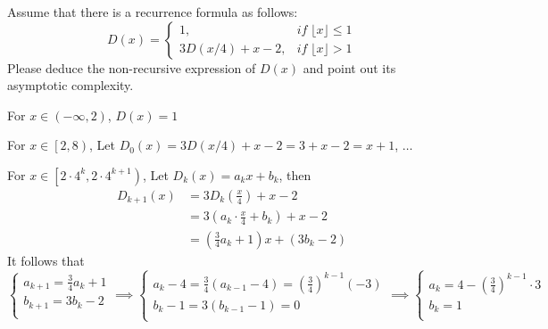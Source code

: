 \begin{exercise}[]{Assume that there is a recurrence formula as follows: 
  \begin{equation*}
    D(x) = \begin{cases}
    1, &if\;\lfloor x \rfloor \leq 1\\
    3D(x/4) + x - 2, &if\;\lfloor x \rfloor  > 1
    \end{cases}
  \end{equation*}
  Please deduce the non-recursive expression of $D(x)$ and point out its asymptotic complexity.    }
  \begin{solution}
  For $x\in \left(-\infty,2\right)$, $D(x)=1$

  For $x\in \left[2,8 \right)$, Let $D_{0}(x)=3D(x/4) + x - 2 = 3 + x -2 = x + 1$, $\ldots$

  For $x\in \left[2\cdot 4^{k}, 2\cdot 4^{k+1}\right)$, Let $D_{k}(x) = a_k x + b_k$, then
  \begin{equation}
    \begin{aligned}
      D_{k+1}(x) &= 3D_k (\frac{x}{4}) + x - 2 \\
      &= 3 \left(a_k \cdot \frac{x}{4} + b_k \right) + x - 2 \\
      &= \left(\frac{3}{4}a_k + 1 \right)x + (3b_k - 2)
    \end{aligned}
  \end{equation}
  It follows that
  \begin{equation}\left\{
    \begin{array}{l}
      a_{k+1} = \frac{3}{4}a_k + 1 \\
      b_{k+1} = 3b_k - 2 \\
    \end{array}\right. \implies \left\{
      \begin{array}{l}
        a_{k} - 4 = \frac{3}{4} (a_{k-1} -4) = \left(\frac{3}{4}\right)^{k-1} (-3)\\
        b_{k} - 1 = 3(b_{k-1} - 1) = 0 \\
      \end{array}\right. \implies \left\{
        \begin{array}{l}
          a_{k}  = 4 - \left(\frac{3}{4}\right)^{k-1} \cdot 3 \\
          b_{k} = 1 \\
        \end{array}\right.
  \end{equation}


\end{solution}
\end{exercise}
